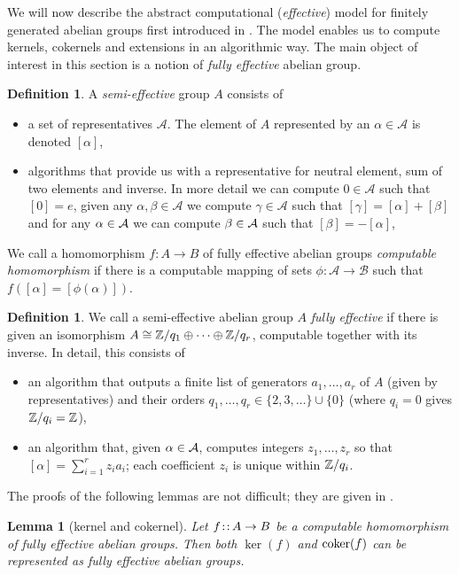 \documentclass[12pt,a4wide]{article}
\theoremstyle{plain}
\newtheorem{lemma}[thm]{Lemma}
\theoremstyle{definition}
\newtheorem{Def}[thm]{Definition}
\newtheorem{definition}[thm]{Definition}
\renewcommand\:{\colon}
\begin{document}
We will now describe the abstract computational (\emph{effective}) model for finitely generated abelian groups first introduced in \cite{cmk}. The model enables us to compute kernels, cokernels and extensions in an algorithmic way.
The main object of interest in this section is a notion of \emph{fully effective} abelian group.
\begin{Def}\label{def:fullyefab}
A \emph{semi-effective} group $A$ consists of 
\begin{itemize}
\item a set of representatives $\mathcal{A}$. The element of $A$ represented by an $\alpha \in \mathcal{A}$ is denoted $[\alpha]$,
\item algorithms that provide us with a representative for neutral element, sum of two elements and inverse. In more detail we can compute $0\in \mathcal{A}$ such that $[0] = e$, given any $\alpha, \beta \in \mathcal{A}$ we compute $\gamma \in \mathcal{A}$ such that $[\gamma] = [\alpha] + [\beta]$ and for any $\alpha \in \mathcal A$ we can compute $\beta \in \mathcal A$ such that $[\beta] = - [\alpha]$,
\end{itemize}
We call a homomorphism $f \colon A \to B$ of fully effective abelian groups  \emph{computable homomorphism} if there is a computable mapping of sets $\phi \colon \mathcal{A} \to \mathcal{B}$ such that $f([\alpha] = [\phi(\alpha)])$.
\end{Def}

\begin{definition}
We call a semi-effective abelian group $A$ \emph{fully effective} if there is given an isomorphism $A\cong\mathbb Z/q_1\oplus\cdots\oplus\mathbb Z/q_r$, computable together with its inverse. In detail, this consists of
\begin{itemize}
\item
an algorithm that outputs a finite list of generators $a_1,\ldots,a_r$ of $A$ (given by representatives) and their orders $q_1,\ldots,q_r\in\{2,3,\ldots\}\cup\{0\}$ (where $q_i=0$ gives $\mathbb Z/q_i=\mathbb Z$),
\item
an algorithm that, given $\alpha\in\mathcal A$, computes integers $z_1,\ldots,z_r$ so that $[\alpha]=\sum_{i=1}^rz_i a_i$; each coefficient $z_i$ is unique within $\mathbb Z/q_i$.
\end{itemize}
\end{definition}

The proofs of the following lemmas are not difficult; they are given in \cite{CKMSVW11}.

\begin{lemma}[kernel and cokernel]\label{l:ker_coker}
Let $f\col A\to B$ be a computable homomorphism
of fully effective abelian groups.
Then both $\ker(f)$ and $\mathop\mathrm{coker}\nolimits(f)$ can be represented as fully effective abelian groups.
\end{lemma}
\end{document}
